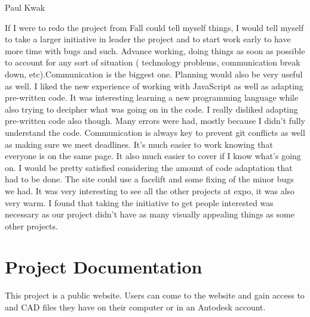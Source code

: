 \documentclass[letterpaper, 10pt, draftclsnofoot, compsoc, onecolumn]{IEEEtran}
\begin{document}
Paul Kwak

If I were to redo the project from Fall could tell myself things, I would tell myself to take a larger initiative in leader the project and to start work early to have more time with bugs and such. Advance working, doing things as soon as possible to account for any sort of situation ( technology problems, communication break down, etc).Communication is the biggest one. Planning would also be very useful as well. I liked the new experience of working with JavaScript as well as adapting pre-written code. It was interesting learning a new programming language while also trying to decipher what was going on in the code. I really disliked adapting pre-written code also though. Many errors were had, mostly because I didn't fully understand the code. Communication is always key to prevent git conflicts as well as making sure we meet deadlines. It's much easier to work knowing that everyone is on the same page. It also much easier to cover if I know what's going on. I would be pretty satisfied considering the amount of code adaptation that had to be done. The site could use a facelift and some fixing of the minor bugs we had. It was very interesting to see all the other projects at expo, it was also very warm. I found that taking the initiative to get people interested was necessary as our project didn't have as many visually appealing things as some other projects.\\

\newpage
\section{Project Documentation}
This project is a public website. Users can come to the website and gain access to and CAD files they have on their computer or in an Autodesk account.\\
\end{document}
